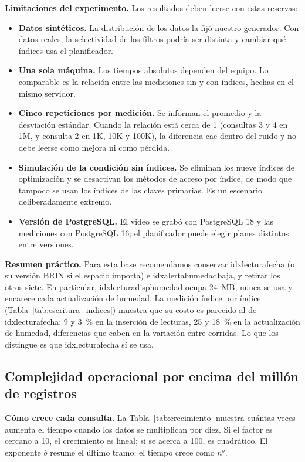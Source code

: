 \documentclass[11pt,letterpaper]{article}
\newcommand{\tbus}{\textunderscore\allowbreak}
\newcommand{\tb}[1]{{\ttfamily\let\_\tbus #1}}
\begin{document}
\textbf{Limitaciones del experimento.} Los resultados deben leerse con estas reservas:
\begin{itemize}
\item \textbf{Datos sintéticos.} La distribución de los datos la fijó nuestro generador. Con datos reales, la selectividad de los filtros podría ser distinta y cambiar qué índices usa el planificador.
\item \textbf{Una sola máquina.} Los tiempos absolutos dependen del equipo. Lo comparable es la relación entre las mediciones sin y con índices, hechas en el mismo servidor.
\item \textbf{Cinco repeticiones por medición.} Se informan el promedio y la desviación estándar. Cuando la relación está cerca de 1 (consultas 3 y 4 en 1M, y consulta 2 en 1K, 10K y 100K), la diferencia cae dentro del ruido y no debe leerse como mejora ni como pérdida.
\item \textbf{Simulación de la condición sin índices.} Se eliminan los nueve índices de optimización y se desactivan los métodos de acceso por índice, de modo que tampoco se usan los índices de las claves primarias. Es un escenario deliberadamente extremo.
\item \textbf{Versión de PostgreSQL.} El video se grabó con PostgreSQL 18 y las mediciones con PostgreSQL 16; el planificador puede elegir planes distintos entre versiones.
\end{itemize}

\textbf{Resumen práctico.} Para esta base recomendamos conservar \tb{idx\_lectura\_fecha} (o su versión BRIN si el espacio importa) e \tb{idx\_alerta\_humedad\_baja}, y retirar los otros siete. En particular, \tb{idx\_lectura\_disp\_humedad} ocupa 24~MB, nunca se usa y encarece cada actualización de humedad. La medición índice por índice (Tabla~\ref{tab:escritura_indices}) muestra que su costo es parecido al de \tb{idx\_lectura\_fecha}: 9 y 3~\% en la inserción de lecturas, 25 y 18~\% en la actualización de humedad, diferencias que caben en la variación entre corridas. Lo que los distingue es que \tb{idx\_lectura\_fecha} sí se usa.

\subsection{Complejidad operacional por encima del millón de registros}
\label{sec:extra}

\textbf{Cómo crece cada consulta.} La Tabla~\ref{tab:crecimiento} muestra cuántas veces aumenta el tiempo cuando los datos se multiplican por diez. Si el factor es cercano a 10, el crecimiento es lineal; si se acerca a 100, es cuadrático. El exponente $b$ resume el último tramo: el tiempo crece como $n^b$.
\end{document}
